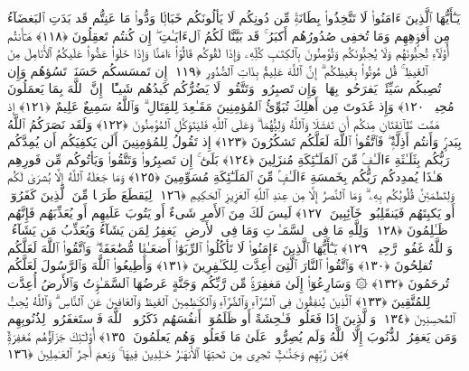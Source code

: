  يَـٰٓأَيُّهَا ٱلَّذِينَ ءَامَنُوا۟ لَا تَتَّخِذُوا۟ بِطَانَةًۭ مِّن دُونِكُم لَا يَألُونَكُم خَبَالًۭا وَدُّوا۟ مَا عَنِتُّم قَد بَدَتِ ٱلبَغضَآءُ مِن أَفوَٟهِهِم وَمَا تُخفِى صُدُورُهُم أَكبَرُ ۚ قَد بَيَّنَّا لَكُمُ ٱلءَايَـٰتِ ۖ إِن كُنتُم تَعقِلُونَ ﴿١١٨﴾
 هَـٰٓأَنتُم أُو۟لَآءِ تُحِبُّونَهُم وَلَا يُحِبُّونَكُم وَتُؤمِنُونَ بِٱلكِتَـٰبِ كُلِّهِۦ وَإِذَا لَقُوكُم قَالُوٓا۟ ءَامَنَّا وَإِذَا خَلَوا۟ عَضُّوا۟ عَلَيكُمُ ٱلأَنَامِلَ مِنَ ٱلغَيظِ ۚ قُل مُوتُوا۟ بِغَيظِكُم ۗ إِنَّ ٱللَّهَ عَلِيمٌۢ بِذَاتِ ٱلصُّدُورِ ﴿١١٩﴾
 إِن تَمسَسكُم حَسَنَةٌۭ تَسُؤهُم وَإِن تُصِبكُم سَيِّئَةٌۭ يَفرَحُوا۟ بِهَا ۖ وَإِن تَصبِرُوا۟ وَتَتَّقُوا۟ لَا يَضُرُّكُم كَيدُهُم شَيـًٔا ۗ إِنَّ ٱللَّهَ بِمَا يَعمَلُونَ مُحِيطٌۭ ﴿١٢٠﴾
 وَإِذ غَدَوتَ مِن أَهلِكَ تُبَوِّئُ ٱلمُؤمِنِينَ مَقَـٰعِدَ لِلقِتَالِ ۗ وَٱللَّهُ سَمِيعٌ عَلِيمٌ ﴿١٢١﴾
 إِذ هَمَّت طَّآئِفَتَانِ مِنكُم أَن تَفشَلَا وَٱللَّهُ وَلِيُّهُمَا ۗ وَعَلَى ٱللَّهِ فَليَتَوَكَّلِ ٱلمُؤمِنُونَ ﴿١٢٢﴾
 وَلَقَد نَصَرَكُمُ ٱللَّهُ بِبَدرٍۢ وَأَنتُم أَذِلَّةٌۭ ۖ فَٱتَّقُوا۟ ٱللَّهَ لَعَلَّكُم تَشكُرُونَ ﴿١٢٣﴾
 إِذ تَقُولُ لِلمُؤمِنِينَ أَلَن يَكفِيَكُم أَن يُمِدَّكُم رَبُّكُم بِثَلَـٰثَةِ ءَالَـٰفٍۢ مِّنَ ٱلمَلَـٰٓئِكَةِ مُنزَلِينَ ﴿١٢٤﴾
 بَلَىٰٓ ۚ إِن تَصبِرُوا۟ وَتَتَّقُوا۟ وَيَأتُوكُم مِّن فَورِهِم هَـٰذَا يُمدِدكُم رَبُّكُم بِخَمسَةِ ءَالَـٰفٍۢ مِّنَ ٱلمَلَـٰٓئِكَةِ مُسَوِّمِينَ ﴿١٢٥﴾
 وَمَا جَعَلَهُ ٱللَّهُ إِلَّا بُشرَىٰ لَكُم وَلِتَطمَئِنَّ قُلُوبُكُم بِهِۦ ۗ وَمَا ٱلنَّصرُ إِلَّا مِن عِندِ ٱللَّهِ ٱلعَزِيزِ ٱلحَكِيمِ ﴿١٢٦﴾
 لِيَقطَعَ طَرَفًۭا مِّنَ ٱلَّذِينَ كَفَرُوٓا۟ أَو يَكبِتَهُم فَيَنقَلِبُوا۟ خَآئِبِينَ ﴿١٢٧﴾
 لَيسَ لَكَ مِنَ ٱلأَمرِ شَىءٌ أَو يَتُوبَ عَلَيهِم أَو يُعَذِّبَهُم فَإِنَّهُم ظَـٰلِمُونَ ﴿١٢٨﴾
 وَلِلَّهِ مَا فِى ٱلسَّمَـٰوَٟتِ وَمَا فِى ٱلأَرضِ ۚ يَغفِرُ لِمَن يَشَآءُ وَيُعَذِّبُ مَن يَشَآءُ ۚ وَٱللَّهُ غَفُورٌۭ رَّحِيمٌۭ ﴿١٢٩﴾
 يَـٰٓأَيُّهَا ٱلَّذِينَ ءَامَنُوا۟ لَا تَأكُلُوا۟ ٱلرِّبَوٰٓا۟ أَضعَـٰفًۭا مُّضَٰعَفَةًۭ ۖ وَٱتَّقُوا۟ ٱللَّهَ لَعَلَّكُم تُفلِحُونَ ﴿١٣٠﴾
 وَٱتَّقُوا۟ ٱلنَّارَ ٱلَّتِىٓ أُعِدَّت لِلكَـٰفِرِينَ ﴿١٣١﴾
 وَأَطِيعُوا۟ ٱللَّهَ وَٱلرَّسُولَ لَعَلَّكُم تُرحَمُونَ ﴿١٣٢﴾
 ۞ وَسَارِعُوٓا۟ إِلَىٰ مَغفِرَةٍۢ مِّن رَّبِّكُم وَجَنَّةٍ عَرضُهَا ٱلسَّمَـٰوَٟتُ وَٱلأَرضُ أُعِدَّت لِلمُتَّقِينَ ﴿١٣٣﴾
 ٱلَّذِينَ يُنفِقُونَ فِى ٱلسَّرَّآءِ وَٱلضَّرَّآءِ وَٱلكَـٰظِمِينَ ٱلغَيظَ وَٱلعَافِينَ عَنِ ٱلنَّاسِ ۗ وَٱللَّهُ يُحِبُّ ٱلمُحسِنِينَ ﴿١٣٤﴾
 وَٱلَّذِينَ إِذَا فَعَلُوا۟ فَـٰحِشَةً أَو ظَلَمُوٓا۟ أَنفُسَهُم ذَكَرُوا۟ ٱللَّهَ فَٱستَغفَرُوا۟ لِذُنُوبِهِم وَمَن يَغفِرُ ٱلذُّنُوبَ إِلَّا ٱللَّهُ وَلَم يُصِرُّوا۟ عَلَىٰ مَا فَعَلُوا۟ وَهُم يَعلَمُونَ ﴿١٣٥﴾
 أُو۟لَـٰٓئِكَ جَزَآؤُهُم مَّغفِرَةٌۭ مِّن رَّبِّهِم وَجَنَّـٰتٌۭ تَجرِى مِن تَحتِهَا ٱلأَنهَـٰرُ خَـٰلِدِينَ فِيهَا ۚ وَنِعمَ أَجرُ ٱلعَـٰمِلِينَ ﴿١٣٦﴾
